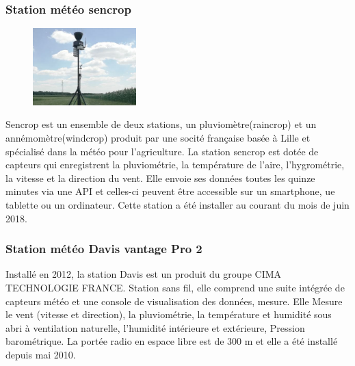 \subsubsection{Station météo sencrop}

\begin{figure}
\includegraphics[width=4cm]{images/imageRang3.jpg}
\end{figure}
Sencrop est un ensemble de deux stations, un pluviomètre(raincrop) et un annémomètre(windcrop) produit par une socité française basée à Lille et spécialisé dans la météo pour l’agriculture. La station sencrop est dotée de capteurs qui enregistrent la pluviométrie, la température de l’aire, l’hygrométrie, la vitesse et la direction du vent. Elle envoie ses données toutes les quinze minutes via une API et celles-ci peuvent être accessible sur un smartphone, ue tablette ou un ordinateur. Cette station a été installer au courant du mois de juin 2018. 

\subsubsection{Station météo Davis vantage Pro 2}

Installé en 2012, la station Davis est un produit du groupe CIMA TECHNOLOGIE FRANCE. Station sans fil, elle comprend une suite intégrée de capteurs météo et une console de visualisation des données, mesure. Elle Mesure le vent (vitesse et direction), la pluviométrie, la température et humidité sous abri à ventilation naturelle, l'humidité intérieure et extérieure, Pression barométrique. La portée radio en espace libre est de 300 m et elle a été installé depuis mai 2010. 


